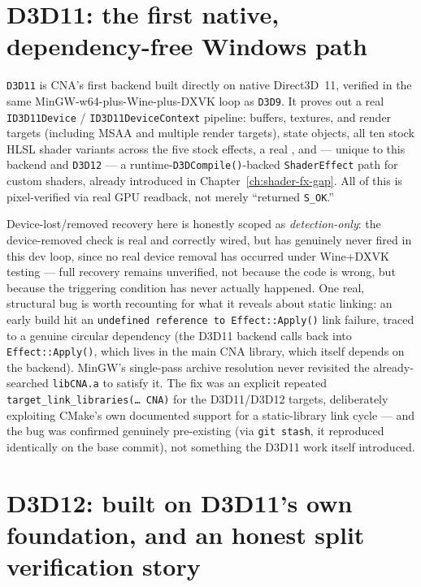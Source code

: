 \section{D3D11: the first native, dependency-free Windows path}

\texttt{D3D11} is CNA's first backend built directly on native Direct3D~11, verified in the
same MinGW-w64-plus-Wine-plus-DXVK loop as \texttt{D3D9}. It proves out a real
\texttt{ID3D11Device} / \texttt{ID3D11DeviceContext} pipeline: buffers, textures, and render
targets (including MSAA and multiple render targets), state objects, all ten stock HLSL
shader variants across the five stock effects, a real , and --- unique
to this backend and \texttt{D3D12} --- a runtime-\texttt{D3DCompile()}-backed
\texttt{ShaderEffect} path for custom shaders, already introduced in
Chapter~\ref{ch:shader-fx-gap}. All of this is pixel-verified via real GPU readback, not
merely ``returned \texttt{S\_OK}.''

Device-lost/removed recovery here is honestly scoped as \emph{detection-only}: the
device-removed check is real and correctly wired, but has genuinely never fired in this dev
loop, since no real device removal has occurred under Wine+DXVK testing --- full recovery
remains unverified, not because the code is wrong, but because the triggering condition has
never actually happened. One real, structural bug is worth recounting for what it reveals
about static linking: an early build hit an \texttt{undefined reference to Effect::Apply()}
link failure, traced to a genuine circular dependency (the D3D11 
backend calls back into \texttt{Effect::Apply()}, which lives in the main CNA library, which
itself depends on the backend). MinGW's single-pass archive resolution never revisited the
already-searched \texttt{libCNA.a} to satisfy it. The fix was an explicit repeated
\texttt{target\_link\_libraries(\ldots{} CNA)} for the D3D11/D3D12 targets, deliberately
exploiting CMake's own documented support for a static-library link cycle --- and the bug was
confirmed genuinely pre-existing (via \texttt{git stash}, it reproduced identically on the
base commit), not something the D3D11 work itself introduced.

\section{D3D12: built on D3D11's own foundation, and an honest split verification story}

